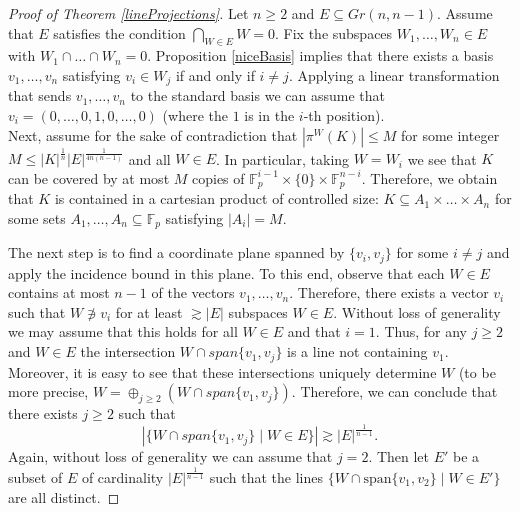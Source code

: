\documentclass{amsart}
\newcommand{\F}{\mathbb F}
\begin{document}
\begin{proof}[Proof of Theorem \ref{lineProjections}]
    Let $n \geq 2$ and $E \subseteq Gr(n, n - 1)$. Assume that $E$ satisfies the condition $\bigcap_{W \in E}W = 0$. Fix the subspaces $W_1, \ldots, W_n \in E$ with $W_1 \cap \ldots \cap W_n = 0$. Proposition \ref{niceBasis} implies that there exists a basis $v_1, \ldots, v_n$ satisfying $v_i  \in W_j$ if and only if $i \neq j$. Applying a linear transformation that sends $v_1, \ldots, v_n$ to the standard basis we can assume that $v_i = (0, \ldots, 0, 1 ,0, \ldots, 0)$ (where the $1$ is in the $i$-th position). \\
    Next, assume for the sake of contradiction that $|\pi^W(K)| \leq M$ for some integer $M \leq |K|^\frac{1}{n}|E|^\frac{1}{4n(n - 1)}$ and all $W \in E$. In particular, taking $W = W_i$ we see that $K$ can be covered by at most $M$ copies of $\F_p^{i - 1} \times \{0\} \times \F_p^{n - i}$. Therefore, we obtain that $K$ is contained in a cartesian product of controlled size: $K \subseteq A_1 \times \ldots \times A_n$ for some sets $A_1, \ldots, A_n \subseteq \F_p$ satisfying $|A_i| = M$. 
    
    The next step is to find a coordinate plane spanned by $\{v_i, v_j\}$ for some $i \neq j$ and apply the incidence bound in this plane. To this end, observe that each $W \in E$ contains at most $n - 1$ of the vectors $v_1, \ldots, v_n$. Therefore, there exists a vector $v_i$ such that $W \not \ni v_i$ for at least $\gtrsim |E|$ subspaces $W \in E$. Without loss of generality we may assume that this holds for all $W \in E$ and that $i = 1$. Thus, for any $j \geq 2$ and $W \in E$ the intersection $W \cap  span \{v_1, v_j\}$ is a line not containing $v_1$. Moreover, it is easy to see that these intersections uniquely determine $W$ (to be more precise, $W = \oplus_{j \geq 2} (W \cap  span \{v_1, v_j\})$. Therefore, we can conclude that there exists $j \geq 2$ such that $$|\{W \cap span \{v_1, v_j\} \mid W \in E \}| \gtrsim |E|^\frac{1}{n - 1}.$$ Again, without loss of generality we can assume that $j = 2$. Then let $E'$ be a subset of $E$ of cardinality $|E|^\frac{1}{n - 1}$ such that the lines $\{W \cap \text{span}\{v_1, v_2\} \mid W \in E'\}$ are all distinct. 


\end{proof}
\end{document}
